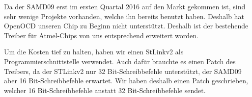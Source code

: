 Da der  SAMD09 erst im  ersten Quartal 2016 auf  den Markt gekommen  ist, sind
sehr wenige Projekte vorhanden, welche ihn bereits benutzt haben.  Deshalb hat
OpenOCD unseren Chip zu Beginn nicht unterst\"utzt. Deshalb ist der bestehende
Treiber f\"ur Atmel-Chips von uns entsprechend erweitert worden.


Um   die   Kosten   tief   zu   halten,   haben   wir   einen   StLinkv2   als
Programmierschnittstelle verwendet. Auch  daf\"ur brauchte es einen  Patch des
Treibers,  da  der  STLinkv2  nur  32  Bit-Schreibbefehle  unterst\"utzt,  der
SAMD09  aber 16  Bit-Schreibbefehle  erwartet. Wir haben  deshalb einen  Patch
geschrieben,  welcher  16  Bit-Schreibbefehle  anstatt  32  Bit-Schreibbefehle
sendet.
